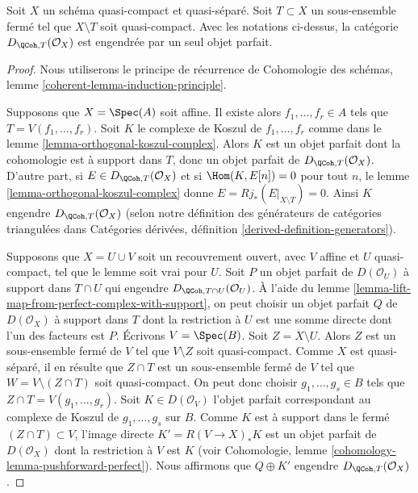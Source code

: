 \begin{lemma}
\label{lemma-generator-with-support}
\begin{reference}
\cite[théorème 6.8]{Rouquier-dimensions}
\end{reference}
Soit $X$ un schéma quasi-compact et quasi-séparé. Soit $T \subset X$ un
sous-ensemble fermé tel que $X \setminus T$ soit quasi-compact. Avec les notations
ci-dessus, la catégorie $D_{\QCoh, T}(\mathcal{O}_X)$ est engendrée par un
seul objet parfait.
\end{lemma}

\begin{proof}
Nous utiliserons le principe de récurrence de
Cohomologie des schémas, lemme \ref{coherent-lemma-induction-principle}.

\medskip\noindent
Supposons que $X = \Spec(A)$ soit affine. Il existe alors
$f_1, \ldots, f_r \in A$ tels que $T = V(f_1, \ldots, f_r)$.
Soit $K$ le complexe de Koszul de $f_1, \ldots, f_r$ comme dans le
lemme \ref{lemma-orthogonal-koszul-complex}.
Alors $K$ est un objet parfait dont la cohomologie est à support dans
$T$, donc un objet parfait de $D_{\QCoh, T}(\mathcal{O}_X)$.
D'autre part, si $E \in D_{\QCoh, T}(\mathcal{O}_X)$ et si
$\Hom(K, E[n]) = 0$ pour tout $n$, le
lemme \ref{lemma-orthogonal-koszul-complex}
donne $E = Rj_*(E|_{X \setminus T}) = 0$.
Ainsi $K$ engendre $D_{\QCoh, T}(\mathcal{O}_X)$
(selon notre définition des générateurs de catégories triangulées dans
Catégories dérivées, définition \ref{derived-definition-generators}).

\medskip\noindent
Supposons que $X = U \cup V$ soit un recouvrement ouvert, avec $V$ affine et
$U$ quasi-compact, tel que le lemme soit vrai pour $U$.
Soit $P$ un objet parfait de $D(\mathcal{O}_U)$ à support dans $T \cap U$
qui engendre $D_{\QCoh, T \cap U}(\mathcal{O}_U)$. À l'aide du
lemme \ref{lemma-lift-map-from-perfect-complex-with-support},
on peut choisir un objet parfait $Q$ de $D(\mathcal{O}_X)$ à support dans $T$
dont la restriction à $U$ est une somme directe dont l'un des facteurs est $P$.
Écrivons $V = \Spec(B)$. Soit $Z = X \setminus U$. Alors $Z$ est un sous-ensemble fermé
de $V$ tel que $V \setminus Z$ soit quasi-compact. Comme $X$ est quasi-séparé,
il en résulte que $Z \cap T$ est un sous-ensemble fermé de $V$ tel que
$W = V \setminus (Z \cap T)$ soit quasi-compact. On peut donc choisir
$g_1, \ldots, g_s \in B$ tels que $Z \cap T = V(g_1, \ldots, g_r)$.
Soit $K \in D(\mathcal{O}_V)$ l'objet parfait correspondant au
complexe de Koszul de $g_1, \ldots, g_s$ sur $B$. Comme $K$ est
à support dans le fermé $(Z \cap T) \subset V$, l'image directe
$K' = R(V \to X)_*K$ est un objet parfait de $D(\mathcal{O}_X)$ dont la
restriction à $V$ est $K$ (voir
Cohomologie, lemme \ref{cohomology-lemma-pushforward-perfect}).
Nous affirmons que $Q \oplus K'$ engendre
$D_{\QCoh, T}(\mathcal{O}_X)$.


\end{proof}
